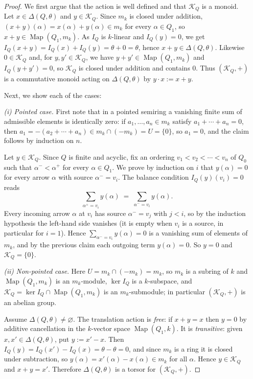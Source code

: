 \documentclass[12pt]{amsart}
\theoremstyle{plain}
\theoremstyle{definition}
\DeclareMathOperator{\map}{Map}
\begin{document}
\begin{proof}
We first argue that the action is well defined and that $\mathcal{K}_Q$ is a monoid. Let $x \in \Delta(Q,\theta)$ and
$y \in \mathcal{K}_Q$. Since $m_k$ is closed under addition,
$(x+y)(\alpha) = x(\alpha) + y(\alpha) \in m_k$ for every $\alpha \in Q_1$, so
$x + y \in \map(Q_1, m_k)$. As $I_Q$ is $k$-linear and $I_Q(y) = 0$, we get
$I_Q(x+y) = I_Q(x) + I_Q(y) = \theta + 0 = \theta$, hence
$x + y \in \Delta(Q,\theta)$. Likewise $0 \in \mathcal{K}_Q$ and, for
$y, y' \in \mathcal{K}_Q$, we have $y + y' \in \map(Q_1, m_k)$ and
$I_Q(y+y') = 0$, so $\mathcal{K}_Q$ is closed under addition and contains $0$.
Thus $(\mathcal{K}_Q,+)$ is a commutative monoid acting on $\Delta(Q,\theta)$ by
$y \cdot x := x + y$.

Next, we show each of the cases:

\medskip
\noindent\emph{(i) Pointed case.}
First note that in a pointed semiring a vanishing finite sum of admissible
elements is identically zero: if $a_1,\dots,a_n \in m_k$ satisfy
$a_1 + \cdots + a_n = 0$, then
$a_1 = -(a_2 + \cdots + a_n) \in m_k \cap (-m_k) = U = \{0\}$, so $a_1 = 0$, and
the claim follows by induction on $n$.

Let $y \in \mathcal{K}_Q$. Since $Q$ is finite and acyclic, fix an
ordering $v_1 < v_2 < \cdots < v_n$ of $Q_0$ such that $\alpha^- < \alpha^+$ for
every $\alpha \in Q_1$. We prove by induction on $i$ that $y(\alpha) = 0$ for
every arrow $\alpha$ with source $\alpha^- = v_i$. The balance condition
$I_Q(y)(v_i) = 0$ reads
\[
  \sum_{\alpha^+ = v_i} y(\alpha) \;=\; \sum_{\alpha^- = v_i} y(\alpha).
\]
Every incoming arrow $\alpha$ at $v_i$ has source $\alpha^- = v_j$ with $j < i$,
so by the induction hypothesis the left-hand side vanishes (it is empty when
$v_i$ is a source, in particular for $i = 1$). Hence
$\sum_{\alpha^- = v_i} y(\alpha) = 0$ is a vanishing sum of elements of $m_k$,
and by the previous claim each outgoing term $y(\alpha) = 0$. So $y = 0$ and $\mathcal{K}_Q = \{0\}$.

\medskip
\noindent\emph{(ii) Non-pointed case.}
Here $U = m_k \cap (-m_k) = m_k$, so $m_k$ is a subring of $k$ and $\map(Q_1, m_k)$ is an $m_k$-module, $\ker I_Q$ is a $k$-subspace,
and $\mathcal{K}_Q = \ker I_Q \cap \map(Q_1, m_k)$ is an $m_k$-submodule; in
particular $(\mathcal{K}_Q,+)$ is an abelian group.

Assume $\Delta(Q,\theta) \neq \varnothing$. The translation action is
\emph{free}: if $x + y = x$ then $y = 0$ by additive cancellation in the
$k$-vector space $\map(Q_1,k)$. It is \emph{transitive}: given
$x, x' \in \Delta(Q,\theta)$, put $y := x' - x$. Then
$I_Q(y) = I_Q(x') - I_Q(x) = \theta - \theta = 0$, and since $m_k$ is a ring it
is closed under subtraction, so $y(\alpha) = x'(\alpha) - x(\alpha) \in m_k$ for
all $\alpha$. Hence $y \in \mathcal{K}_Q$ and $x + y = x'$. Therefore
$\Delta(Q,\theta)$ is a torsor for $(\mathcal{K}_Q,+)$.


\end{proof}
\end{document}

